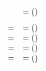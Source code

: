 \documentclass[oneside,12pt]{article}
\begin{document}
$\scalebox{0.6}{$
 \begin{array}{cr}
 & \ga{[MV2]}          = \pga{MV2 orig} \\ \\[-5pt]
             \ga{[S4]} =  \ga{S4}      %
 & \ga{[MV2]}\ga{[S4]} = \pga{MV2 S4}   \\
             \ga{[S5]} =  \ga{S5}      %
 & \ga{[MV2]}\ga{[S5]} = \pga{MV2 S5}   \\
             \ga{[S6]} =  \ga{S6}      %
 & \ga{[MV2]}\ga{[S6]} = \pga{MV2 S6}   \\
             \ga{[S7]} =  \ga{S7}      %
 & \ga{[MV2]}\ga{[S7]} = \pga{MV2 S7}   \\
 \end{array}
 $}
$







\end{document}
